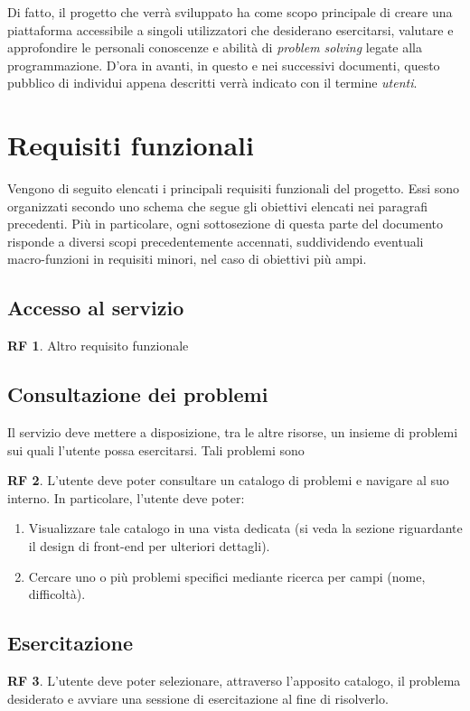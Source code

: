 \documentclass[11pt, a4paper]{article}
\theoremstyle{definition}
\newtheorem{funcreq}{RF} %
\begin{document}
Di fatto, il progetto che verrà sviluppato ha come scopo principale di
creare una piattaforma accessibile a singoli utilizzatori che desiderano
esercitarsi, valutare e approfondire le personali conoscenze e abilità di
\textit{problem solving} legate alla programmazione.
D'ora in avanti, in questo e nei successivi documenti, questo pubblico di
individui appena descritti verrà indicato con il termine \textit{utenti}.

\section{Requisiti funzionali}
Vengono di seguito elencati i principali requisiti funzionali del progetto.
Essi sono organizzati secondo uno schema che segue gli obiettivi elencati nei
paragrafi precedenti. Più in particolare, ogni sottosezione di questa parte
del documento risponde a diversi scopi precedentemente accennati, suddividendo
eventuali macro-funzioni in requisiti minori, nel caso di obiettivi più ampi.

\subsection*{Accesso al servizio}

\begin{funcreq}
Altro requisito funzionale
\end{funcreq}


\subsection*{Consultazione dei problemi}
Il servizio deve mettere a disposizione, tra le altre risorse, un insieme di problemi sui quali l'utente possa esercitarsi. Tali problemi sono 

\begin{funcreq}
L'utente deve poter consultare un catalogo di problemi e navigare al suo
interno. In particolare, l'utente deve poter:
\begin{enumerate}
    \item Visualizzare tale catalogo in una vista dedicata (si veda la
    sezione riguardante il design di front-end per ulteriori dettagli).
    \item Cercare uno o più problemi specifici mediante ricerca per campi (nome,
    difficoltà).
\end{enumerate}
\end{funcreq}

\subsection*{Esercitazione}
\begin{funcreq}
L'utente deve poter selezionare, attraverso l'apposito catalogo, il problema desiderato e avviare una sessione di esercitazione al fine di risolverlo.
\end{funcreq}
\end{document}
